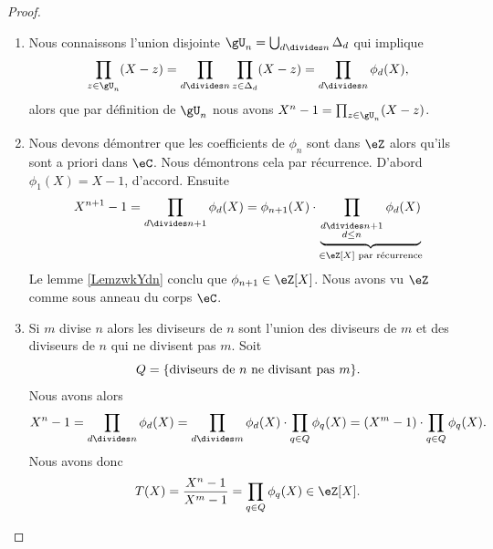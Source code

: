 \begin{proof}

    \begin{enumerate}
        \item

            Nous connaissons l'union disjointe \( \gU_n=\bigcup_{d\divides n}\Delta_d\) qui implique
            \begin{equation}
                \prod_{z\in \gU_n}(X-z)=\prod_{d\divides n}\prod_{z\in \Delta_d}(X-z)=\prod_{d\divides n}\phi_d(X),
            \end{equation}
            alors que par définition de \( \gU_n\) nous avons \( X^n-1=\prod_{z\in\gU_n}(X-z)\).

        \item

            Nous devons démontrer que les coefficients de \( \phi_n\) sont dans \( \eZ\) alors qu'ils sont a priori dans \( \eC\). Nous démontrons cela par récurrence. D'abord \( \phi_1(X)=X-1\), d'accord. Ensuite
            \begin{equation}
                X^{n+1}-1=\prod_{d\divides n+1}\phi_d(X)=\phi_{n+1}(X)\cdot\underbrace{\prod_{_{\substack{d\divides n+1\\d\leq n}}}\phi_d(X)}_{\in\eZ[X]\text{ par récurrence}}
            \end{equation}
            Le lemme \ref{LemzwkYdn} conclu que \( \phi_{n+1}\in \eZ[X]\). Nous avons vu \( \eZ\) comme sous anneau du corps \( \eC\).

        \item

            Si \( m\) divise \( n\) alors les diviseurs de \( n\) sont l'union des diviseurs de \( m\) et des diviseurs de \( n\) qui ne divisent pas \( m\). Soit
            \begin{equation}
                Q=\{\text{diviseurs de \( n\) ne divisant pas \( m\)} \}.
            \end{equation}
            Nous avons alors
            \begin{equation}
                X^n-1=\prod_{d\divides n}\phi_d(X)=\prod_{d\divides m}\phi_d(X)\cdot\prod_{q\in Q}\phi_q(X)=(X^m-1)\cdot\prod_{q\in Q}\phi_q(X).
            \end{equation}
            Nous avons donc
            \begin{equation}
                T(X)=\frac{ X^n-1 }{ X^m-1 }=\prod_{q\in Q}\phi_q(X)\in \eZ[X].
            \end{equation}
            

\end{enumerate}
\end{proof}
